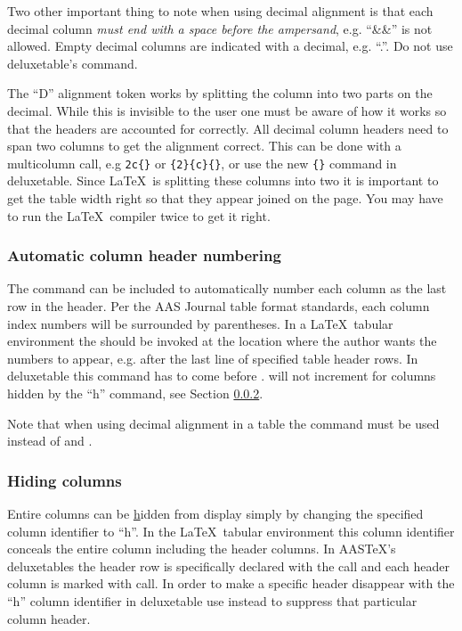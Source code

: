 \documentclass{aastex63}
\newcommand\aastex{AAS\TeX}
\newcommand\latex{La\TeX}
\begin{document}
Two other important thing to note when using decimal alignment is that each
decimal column \textit{must end with a space before the ampersand}, e.g.
``\&\&'' is not allowed.  Empty decimal columns are indicated with a decimal,
e.g. ``.''.  Do not use deluxetable's {\tt\string\nodata} command.

The ``D'' alignment token works by splitting the column into two parts on the
decimal.  While this is invisible to the user one must be aware of how it
works so that the headers are accounted for correctly.  All decimal column
headers need to span two columns to get the alignment correct. This can be
done with a multicolumn call, e.g {\tt\string\multicolumn2c\{\}} or
{\tt\string\multicolumn\{2\}\{c\}\{\}}, or use the new
{\tt\string\twocolhead\{\}} command in deluxetable.  Since \latex\ is
splitting these columns into two it is important to get the table width
right so that they appear joined on the page.  You may have to run the
\latex\ compiler twice to get it right.  

\subsubsection{Automatic column header numbering} \label{subsubsec:autonumber}

The command {\tt\string\colnumbers} can be included to automatically number
each column as the last row in the header. Per the AAS Journal table format
standards, each column index numbers will be surrounded by parentheses. In
a \latex\ tabular environment the {\tt\string\colnumbers} should be invoked
at the location where the author wants the numbers to appear, e.g. after
the last line of specified table header rows. In deluxetable this command
has to come before {\tt\string\startdata}.  {\tt\string\colnumbers} will
not increment for columns hidden by the ``h'' command, see Section
\ref{subsubsec:hide}. 

Note that when using decimal alignment in a table the command 
{\tt\string\decimalcolnumbers} must be used instead of 
{\tt\string\colnumbers} and {\tt\string\decimals}. 

\subsubsection{Hiding columns} \label{subsubsec:hide}

Entire columns can be \underline{h}idden from display simply by changing
the specified column identifier to ``h''.  In the \latex\ tabular environment
this column identifier conceals the entire column including the header
columns.   In \aastex's deluxetables the header row is specifically
declared with the {\tt\string\tablehead} call and each header column is
marked with {\tt\string\colhead} call.  In order to make a specific header
disappear with the ``h'' column identifier in deluxetable use 
{\tt\string\nocolhead} instead to suppress that particular column header.
\end{document}
